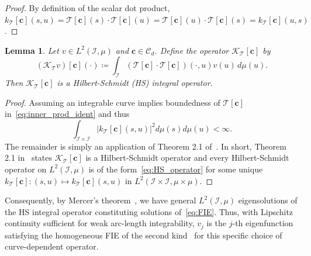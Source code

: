 \documentclass[pdflatex,iicol]{sn-jnl}%
\theoremstyle{thmstyleone}%
\newtheorem{lemma}{Lemma}%
\theoremstyle{thmstyletwo}%
\theoremstyle{thmstylethree}%
\begin{document}
\begin{proof}
    By definition of the scalar dot product, $k_{\mathcal{T}}[\boldsymbol{c}](s,u) = \mathcal{T}[\boldsymbol{c}](s) \cdot \mathcal{T}[\boldsymbol{c}](u) = \mathcal{T}[\boldsymbol{c}](u) \cdot \mathcal{T}[\boldsymbol{c}](s) = k_{\mathcal{T}}[\boldsymbol{c}](u,s)$.
\end{proof}

\begin{lemma}\label{lemma:HS_int_opt}
    Let $v \in L^2(\mathcal{I},\mu)$ and $\boldsymbol{c} \in \mathcal{C}_d$. Define the operator $\mathcal{K}_{\mathcal{T}}[\boldsymbol{c}]$ by
    \begin{equation}\label{eq:HS_operator}
        (\mathcal{K}_{\mathcal{T}}v)[\boldsymbol{c}](\cdot) \coloneqq \int_{\mathcal{I}}\left(\mathcal{T}[\boldsymbol{c}] \cdot \mathcal{T}[\boldsymbol{c}]\right)(\cdot,u)v(u)\, d\mu(u).
    \end{equation}
    Then $\mathcal{K}_{\mathcal{T}}[\boldsymbol{c}]$ is a Hilbert-Schmidt (HS) integral operator.
\end{lemma}

\begin{proof}
    Assuming an integrable curve implies boundedness of $\mathcal{T}[\boldsymbol{c}]$ in~\eqref{eq:inner_prod_ident} and thus
    \begin{equation}
        \int_{\mathcal{I}\times \mathcal{I}}\vert k_{\mathcal{T}}[\boldsymbol{c}](s,u)\vert^2d\mu(s)d\mu(u) < \infty.
    \end{equation}
    The remainder is simply an application of Theorem 2.1 of~\cite{fasshauer2015kernel}. In short, Theorem 2.1 in~\cite{fasshauer2015kernel} states $\mathcal{K}_{\mathcal{T}}[\boldsymbol{c}]$ is a Hilbert-Schmidt operator and every Hilbert-Schmidt operator on $L^2(\mathcal{I}, \mu)$ is of the form~\eqref{eq:HS_operator} for some unique $k_{\mathcal{T}}[\boldsymbol{c}]:(s,u) \mapsto k_{\mathcal{T}}[\boldsymbol{c}](s,u)$ in $L^2(\mathcal{I} \times \mathcal{I},\mu\times \mu)$.
\end{proof}

Consequently, by Mercer's theorem~\cite{fasshauer2015kernel}, we have general $L^2(\mathcal{I},\mu)$ eigensolutions of the HS integral operator constituting solutions of~\eqref{eq:FIE}. Thus, with Lipschitz continuity sufficient for weak arc-length integrability, $v_j$ is the $j$-th eigenfunction satisfying the homogeneous FIE of the second kind~\cite{fasshauer2015kernel} for this specific choice of curve-dependent operator. 
\end{document}
